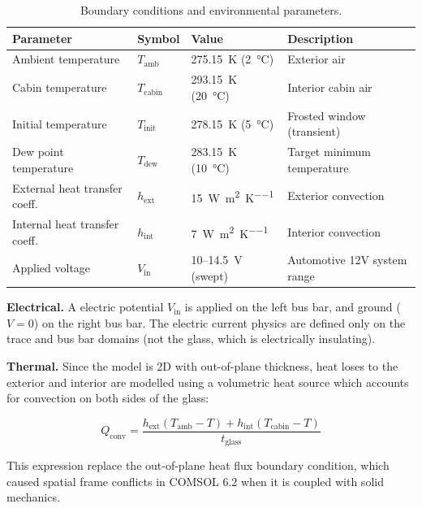 \begin{table}[H]
    \centering
    \caption{Boundary conditions and environmental parameters.}
    \label{tab:bcs}
    \begin{tabular}{@{}llll@{}}
        \toprule
        \textbf{Parameter} & \textbf{Symbol} & \textbf{Value} & \textbf{Description} \\
        \midrule
        Ambient temperature     & $T_\text{amb}$   & \SI{275.15}{\kelvin} (\SI{2}{\degreeCelsius})  & Exterior air \\
        Cabin temperature       & $T_\text{cabin}$ & \SI{293.15}{\kelvin} (\SI{20}{\degreeCelsius}) & Interior cabin air \\
        Initial temperature     & $T_\text{init}$  & \SI{278.15}{\kelvin} (\SI{5}{\degreeCelsius})  & Frosted window (transient) \\
        Dew point temperature   & $T_\text{dew}$   & \SI{283.15}{\kelvin} (\SI{10}{\degreeCelsius}) & Target minimum temperature \\
        External heat transfer coeff. & $h_\text{ext}$  & \SI{15}{\watt\per\metre\squared\per\kelvin}   & Exterior convection \\
        Internal heat transfer coeff. & $h_\text{int}$  & \SI{7}{\watt\per\metre\squared\per\kelvin}    & Interior convection \\
        Applied voltage         & $V_\text{in}$    & 10--\SI{14.5}{\volt} (swept) & Automotive 12V system range \\
        \bottomrule
    \end{tabular}
\end{table}

\textbf{Electrical.} A electric potential $V_\text{in}$ is applied on the left bus bar, and ground ($V = 0$) on the right bus bar. The electric current physics are defined only on the trace and bus bar domains (not the glass, which is electrically insulating).

\textbf{Thermal.} Since the model is 2D with out-of-plane thickness, heat loses to the exterior and interior are modelled using a volumetric heat source which accounts for convection on both sides of the glass:

\begin{equation}
    Q_\text{conv} = \frac{h_\text{ext}(T_\text{amb} - T) + h_\text{int}(T_\text{cabin} - T)}{t_\text{glass}}
    \label{eq:heat-source}
\end{equation}

This expression replace the out-of-plane heat flux boundary condition, which caused spatial frame conflicts in COMSOL 6.2 when it is coupled with solid mechanics.


